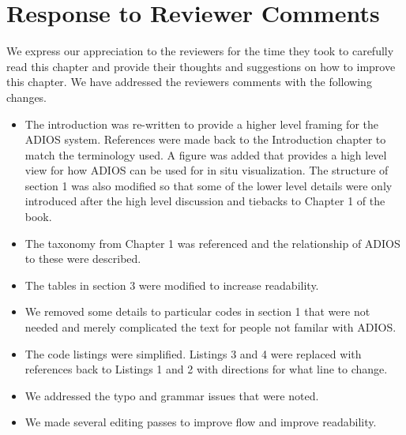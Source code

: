 \setcounter{section}{-1}
\section{Response to Reviewer Comments}

We express our appreciation to the reviewers for the time they took to carefully read this chapter and provide their thoughts and suggestions on how to improve this chapter.  We have addressed the reviewers comments with the following changes.
\begin{itemize}
    \item The introduction was re-written to provide a higher level framing for the ADIOS system. References were made back to the Introduction chapter to match the terminology used. A figure was added that provides a high level view for how ADIOS can be used for in situ visualization. The structure of section 1 was also modified so that some of the lower level details were only introduced after the high level discussion and tiebacks to Chapter 1 of the book.
    \item The taxonomy from Chapter 1 was referenced and the relationship of ADIOS to these were described.
    \item The tables in section 3 were modified to increase readability.
    \item We removed some details to particular codes in section 1 that were not needed and merely complicated the text for people not familar with ADIOS.
    \item The code listings were simplified. Listings 3 and 4 were replaced with references back to Listings 1 and 2 with directions for what line to change.
    \item We addressed the typo and grammar issues that were noted.
    \item We made several editing passes to improve flow and improve readability.
\end{itemize}

